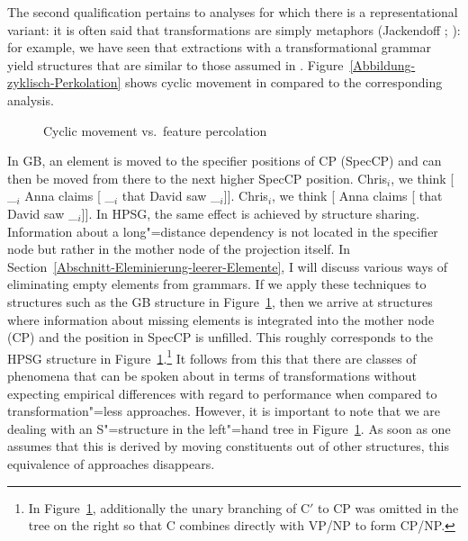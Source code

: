 The second qualification pertains to analyses for which there is a representational variant: it is often said that transformations are simply
metaphors (Jackendoff \citeyear[--23]{Jackendoff2000a}; \citeyear[, 20]{Jackendoff2007a}): for example, we have seen that extractions with a transformational grammar yield structures that
are similar to those assumed in \hpsg. Figure~\vref{Abbildung-zyklisch-Perkolation} shows cyclic movement in \gbt compared
to the corresponding \hpsg analysis.
\begin{figure}
\hfill%
\hfill
{}
\hfill\mbox{}%
\caption{Cyclic movement vs.\ feature percolation}\label{Abbildung-zyklisch-Perkolation}
\end{figure}%

In GB, an element is moved to the specifier positions of CP (SpecCP) and can then be moved from there to the next higher SpecCP position.
\eal\settowidth{}
\ex
Chris$_i$, we think [ \_$_i$ Anna claims [ \_$_i$ that David saw \_$_i$]].
\ex
Chris$_i$, we think [ Anna claims [ that David saw \_$_i$]].
\zl
In HPSG, the same effect is achieved by structure sharing. Information about a long"=distance dependency
is not located in the specifier node but rather in the mother node of the projection itself. In Section~\ref{Abschnitt-Eleminierung-leerer-Elemente},
I will discuss various ways of eliminating empty elements from grammars. If we apply these techniques to structures such as the GB structure
in Figure~\ref{Abbildung-zyklisch-Perkolation}, then we arrive at structures where information about missing elements is integrated into the
mother node (CP) and the position in SpecCP is unfilled. This roughly corresponds to the HPSG structure in Figure~\ref{Abbildung-zyklisch-Perkolation}.\footnote{ 
In Figure~\ref{Abbildung-zyklisch-Perkolation}, additionally the unary branching of C$'$ to CP was omitted in the tree on the right so that C combines directly with VP/NP
to form CP/NP.%
}
It follows from this that there are classes of phenomena that
can be spoken about in terms of transformations without expecting empirical differences with regard to
performance when compared to transformation"=less approaches.
However, it is important to note that we are dealing with an S"=structure in the left"=hand tree in Figure~\ref{Abbildung-zyklisch-Perkolation}. As soon as one assumes
that this is derived by moving constituents out of other structures, this equivalence of approaches disappears.

